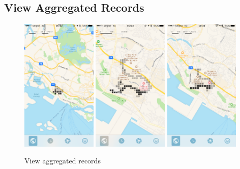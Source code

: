 \documentclass[12pt,a4paper]{article}
\begin{document}
        \subsection{View Aggregated Records} %
            \label{sec:view-aggregated-records}
            \begin{figure}[H]
                \includegraphics[width=0.32\textwidth]{4-1-4-a}
                \includegraphics[width=0.32\textwidth]{4-1-4-c}
                \includegraphics[width=0.32\textwidth]{4-1-4-b}
                \centering
                \caption{View aggregated records}
                \label{fig:aggregated-records}
            \end{figure}
            
\end{document}
